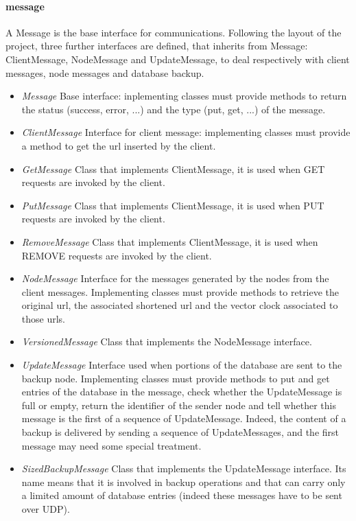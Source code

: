 \documentclass{article}
\begin{document}
\paragraph{message} A Message is the base interface for communications. Following the layout of the project, three further interfaces are defined, that inherits from Message: ClientMessage, NodeMessage and UpdateMessage, to deal respectively with client messages, node messages and database backup. 
\begin{itemize}
\item \textit{Message} Base interface: inplementing classes must provide methods to return the status (success, error, ...) and the type (put, get, ...) of the message.
\item \textit{ClientMessage} Interface for client message: implementing classes must provide a method to get the url inserted by the client.
\item \textit{GetMessage} Class that implements ClientMessage, it is used when GET requests are invoked by the client.
\item \textit{PutMessage} Class that implements ClientMessage, it is used when PUT requests are invoked by the client.
\item \textit{RemoveMessage} Class that implements ClientMessage, it is used when REMOVE requests are invoked by the client.
\item \textit{NodeMessage} Interface for the messages generated by the nodes from the client messages. Implementing classes must provide methods to retrieve the original url, the associated shortened url and the vector clock associated to those urls.
\item \textit{VersionedMessage} Class that implements the NodeMessage interface.
\item \textit{UpdateMessage} Interface used when portions of the database are sent to the backup node. Implementing classes must provide methods to put and get entries of the database in the message, check whether the UpdateMessage is full or empty, return the identifier of the sender node and tell whether this message is the first of a sequence of UpdateMessage. Indeed, the content of a backup is delivered by sending a sequence of UpdateMessages, and the first message may need some special treatment.
\item \textit{SizedBackupMessage} Class that implements the UpdateMessage interface. Its name means that it is involved in backup operations and that can carry only a limited amount of database entries (indeed these messages have to be sent over UDP).
\end{itemize}
\end{document}
